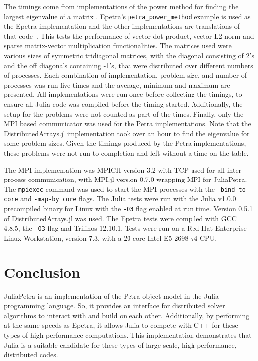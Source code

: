 \documentclass[acmsmall]{acmart}
\begin{document}
	The timings come from implementations of the power method for finding the largest eigenvalue of a matrix
	\cite{Gu:2000:PowerMethod}.
	Epetra's \texttt{petra\_power\_method} example is used as the Epetra implementation and the other implementations are translations of that code~\cite{Heroux:2005:Trilinos}.
	This tests the performance of vector dot product, vector L2-norm and sparse matrix-vector multiplication functionalities.
	The matrices used were various sizes of symmetric tridiagonal matrices, with the diagonal consisting of 2's
	and the off diagonals containing -1's, that were distributed over different numbers of processes.
	Each combination of implementation, problem size, and number of processes was run five times and the average, minimum and maximum are presented.
	All implementations were run once before collecting the timings, to ensure all Julia code was
	compiled before the timing started.
	Additionally, the setup for the problems were not counted as part of the times.
	Finally, only the MPI based communicator was used for the Petra implementations.
	Note that the DistributedArrays.jl implementation took over an hour to find the eigenvalue for some problem sizes.
	Given the timings produced by the Petra implementations, these problems were not run to completion and left without a time on the table.
	
	The MPI implementation was MPICH version 3.2 with TCP used for all inter-process communication, with MPI.jl version 0.7.0 wrapping MPI for JuliaPetra.
	The \texttt{mpiexec} command was used to start the MPI processes with the \texttt{-bind-to core} and \texttt{-map-by core} flags.
	The Julia tests were run with the Julia v1.0.0 precompiled binary for Linux with the \texttt{-O3} flag enabled at run time.
	Version 0.5.1 of DistributedArrays.jl was used.
	The Epetra tests were compiled with GCC 4.8.5, the \texttt{-O3} flag and Trilinos 12.10.1.
	Tests were run on a Red Hat Enterprise Linux Workstation, version 7.3,
	with a 20 core Intel E5-2698 v4 CPU.
	
	\section{Conclusion}
	
	JuliaPetra is an implementation of the Petra object model in the Julia programming language.
	So, it provides an interface for distributed solver algorithms to interact with and build on each other.
	Additionally, by performing at the same speeds as Epetra,
	it allows Julia to compete with C++ for these types of high performance computations.
	This implementation demonstrates that Julia is a suitable candidate for these types of large scale, high performance, distributed codes.
	
	
	
\end{document}
